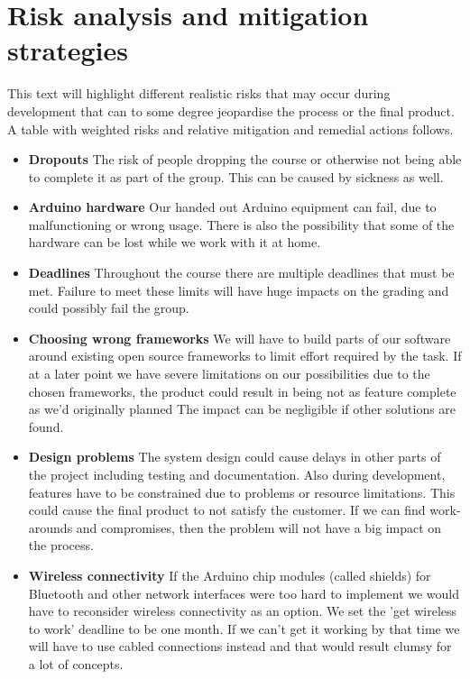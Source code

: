 \section{Risk analysis and mitigation strategies}

This text will highlight different realistic risks that may occur during development
that can to some degree jeopardise the process or the final product.
A table with weighted risks and relative mitigation and remedial actions follows.

\begin{itemize}

\item \textbf{Dropouts}\newline
The risk of people dropping the course or otherwise not being able to complete it as part
of the group. This can be caused by sickness as well.

\item \textbf{Arduino hardware}\newline
Our handed out Arduino equipment can fail, due to malfunctioning or wrong usage.
There is also the possibility that some of the hardware can be lost while we work with it at home.

\item \textbf{Deadlines}\newline
Throughout the course there are multiple deadlines that must be met. Failure to meet
these limits will have huge impacts on the grading and could possibly fail the group.

\item \textbf{Choosing wrong frameworks}\newline
We will have to build parts of our software around existing open source frameworks to limit effort required by the task. If at a later point we have severe limitations
on our possibilities due to the chosen frameworks, the product could result in being not as feature complete as we'd originally planned The impact can be negligible if other solutions are found.

\item \textbf{Design problems}\newline
The system design could cause delays in other parts of the project
including testing and documentation. Also during development, features have to be constrained due to problems
or resource limitations. This could cause the final product to not satisfy the customer.
If we can find work-arounds and compromises, then the problem will not have a big impact on the process.

\item \textbf{Wireless connectivity}\newline
If the Arduino chip modules (called shields) for Bluetooth and other network interfaces were too
hard to implement we would have to reconsider wireless connectivity as an option.
We set the 'get wireless to work' deadline to be one month. If we can't get it working
by that time we will have to use cabled connections instead and that would result clumsy
for a lot of concepts.
\end{itemize}


